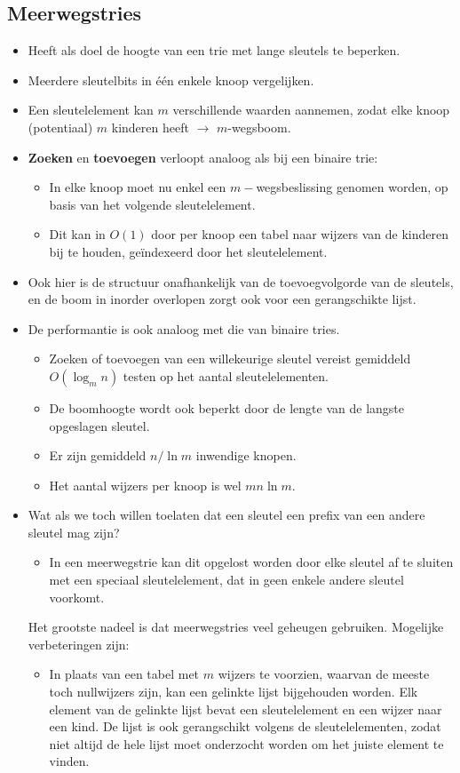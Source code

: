 \subsection{Meerwegstries}
\begin{itemize}
    \item Heeft als doel de hoogte van een trie met lange sleutels te beperken.
    \item Meerdere sleutelbits in één enkele knoop vergelijken.
    \item Een sleutelelement kan $m$ verschillende waarden aannemen, zodat elke knoop (potentiaal) $m$ kinderen heeft $\rightarrow$ $m$-wegsboom.
    \item \textbf{Zoeken} en \textbf{toevoegen} verloopt analoog als bij een binaire trie:
    \begin{itemize}
        \item In elke knoop moet nu enkel een $m-$wegsbeslissing genomen worden, op basis van het volgende sleutelelement.
        \item Dit kan in $O(1)$ door per knoop een tabel naar wijzers van de kinderen bij te houden, geïndexeerd door het sleutelelement.
    \end{itemize}
    \item Ook hier is de structuur onafhankelijk van de toevoegvolgorde van de sleutels, en de boom in inorder overlopen zorgt ook voor een gerangschikte lijst.
    \item De performantie is ook analoog met die van binaire tries.
    \begin{itemize}
        \item Zoeken of toevoegen van een willekeurige sleutel vereist gemiddeld $O(\log_m n)$ testen op het aantal sleutelelementen.
        \item De boomhoogte wordt ook beperkt door de lengte van de langste opgeslagen sleutel.
        \item Er zijn gemiddeld $n/\ln m$ inwendige knopen.
        \item Het aantal wijzers per knoop is wel $mn \ln m$.
    \end{itemize}
    \item Wat als we toch willen toelaten dat een sleutel een prefix van een andere sleutel mag zijn?
    \begin{itemize}
        \item In een meerwegstrie kan dit opgelost worden door elke sleutel af te sluiten met een speciaal sleutelelement, dat in geen enkele andere sleutel voorkomt.
    \end{itemize}
    \alert Het grootste nadeel is dat meerwegstries veel geheugen gebruiken. Mogelijke verbeteringen zijn:
    \begin{itemize}
        \item In plaats van een tabel met $m$ wijzers te voorzien, waarvan de meeste toch nullwijzers zijn, kan een gelinkte lijst bijgehouden worden. Elk element van de gelinkte lijst bevat een sleutelelement en een wijzer naar een kind. De lijst is ook gerangschikt volgens de sleutelelementen, zodat niet altijd de hele lijst moet onderzocht worden om het juiste element te vinden.
        

\end{itemize}
\end{itemize}
